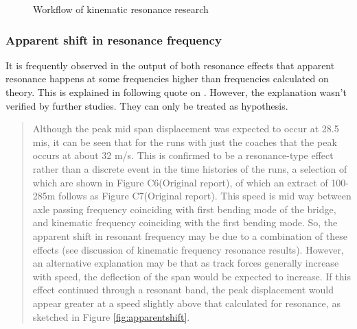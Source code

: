 \begin{figure}[h]
\centering
{}
\caption{Workflow of kinematic resonance research}
\label{fig:workflow329kinematic}
\end{figure}

\subsubsection{Apparent shift in resonance frequency}\label{sec:apparentshift}
It is frequently observed in the output of both resonance effects that apparent resonance happens at some frequencies higher than frequencies calculated on theory. This is explained in following quote on \citet[Page 13, Secondary Phase]{d181dt329}. However, the explanation wasn't verified by further studies. They can only be treated as hypothesis.

\begin{quote}
Although the peak mid span displacement was expected to occur at 28.5 mis, it can be seen that for the runs with just the coaches that the peak occurs at about 32 m/s. This is confirmed to be a resonance-type effect rather than a discrete event in the time histories of the runs, a selection of which are shown in Figure C6(Original report), of which an extract of 100-285m follows as Figure C7(Original report). This speed is mid way between axle passing frequency coinciding with first bending mode of the bridge, and kinematic frequency coinciding with the first bending mode. So, the apparent shift in resonant frequency may be due to a combination of these effects (see discussion of kinematic frequency resonance results). However, an alternative explanation may be that as track forces generally increase with speed, the deflection of the span would be expected to increase. If this effect continued through a resonant band, the peak displacement would appear greater at a speed slightly above that calculated for resonance, as sketched in Figure \ref{fig:apparentshift}.
\end{quote}

